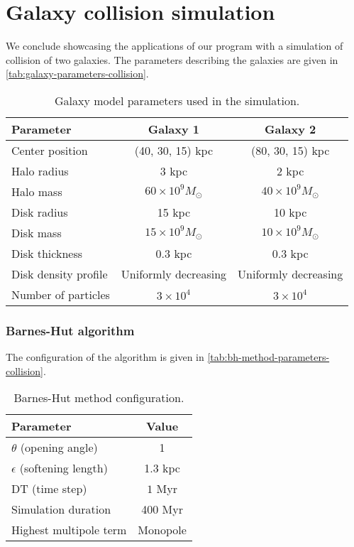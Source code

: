 \section{Galaxy collision simulation}
We conclude showcasing the applications of our program with a simulation of collision of two galaxies.
The parameters describing the galaxies are given in \autoref{tab:galaxy-parameters-collision}.
\begin{table}[htp]
    \centering
    \begin{tabular}{|l|c|c|}
        \hline
        \textbf{Parameter}   & \textbf{Galaxy 1}        & \textbf{Galaxy 2}        \\
        \hline
        Center position      & (40, 30, 15) kpc         & (80, 30, 15) kpc         \\
        Halo radius          & 3 kpc                    & 2 kpc                    \\
        Halo mass            & $60 \times 10^9 M_\odot$ & $40 \times 10^9 M_\odot$ \\
        Disk radius          & 15 kpc                   & 10 kpc                   \\
        Disk mass            & $15 \times 10^9 M_\odot$ & $10 \times 10^9 M_\odot$ \\
        Disk thickness       & 0.3 kpc                  & 0.3 kpc                  \\
        Disk density profile & Uniformly decreasing     & Uniformly decreasing     \\
        Number of particles  & $3 \times 10^4$          & $3 \times 10^4$          \\
        \hline
    \end{tabular}
    \caption{Galaxy model parameters used in the simulation.}
    \label{tab:galaxy-parameters-collision}
\end{table}
\subsubsection{Barnes-Hut algorithm}
The configuration of the algorithm is given in \autoref{tab:bh-method-parameters-collision}.
\begin{table}[htp]
    \centering
    \begin{tabular}{|l|c|}
        \hline
        \textbf{Parameter}            & \textbf{Value} \\
        \hline
        $\theta$ (opening angle)      & 1              \\
        $\epsilon$ (softening length) & 1.3 kpc        \\
        DT (time step)                & $1$ Myr        \\
        Simulation duration           & 400 Myr        \\
        Highest multipole term        & Monopole       \\
        \hline
    \end{tabular}
    \caption{Barnes-Hut method configuration.}
    \label{tab:bh-method-parameters-collision}
\end{table}

